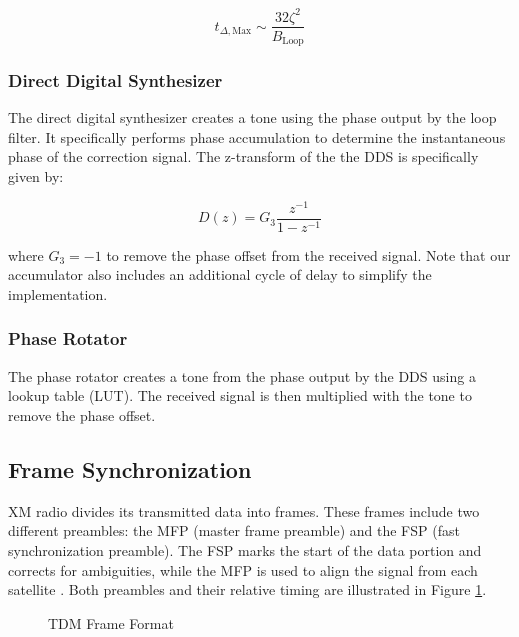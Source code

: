 \documentclass[conference,onecolumn]{IEEEtran}
\begin{document}
\begin{equation}
	t_{\Delta,\text{Max}} \sim \frac{32\zeta^2}{B_\text{Loop}}\end{equation}

\subsubsection{Direct Digital Synthesizer}

The direct digital synthesizer creates a tone using the phase output by the loop filter. It specifically performs phase accumulation to determine the instantaneous phase of the correction signal. The z-transform of the the DDS is specifically given by:

\begin{equation}
	D(z) = G_3\frac{z^{-1}}{1 - z^{-1}}
\end{equation}

\noindent where $G_3 = -1$ to remove the phase offset from the received signal. Note that our accumulator also includes an additional cycle of delay to simplify the implementation.

\subsubsection{Phase Rotator}

The phase rotator creates a tone from the phase output by the DDS using a lookup table (LUT). The received signal is then multiplied with the tone to remove the phase offset.

\subsection{Frame Synchronization}

XM radio divides its transmitted data into frames. These frames include two different preambles: the MFP (master frame preamble) and the FSP (fast synchronization preamble). The FSP marks the start of the data portion and corrects for ambiguities, while the MFP is used to align the signal from each satellite \cite{a2008_us8260192b2}. Both preambles and their relative timing are illustrated in Figure \ref{fig::tdm_frame_format}.

\begin{figure}[H]
	\centerline{}
	\caption{TDM Frame Format \cite{a2008_us8260192b2}}
	\label{fig::tdm_frame_format}
\end{figure}
\end{document}

